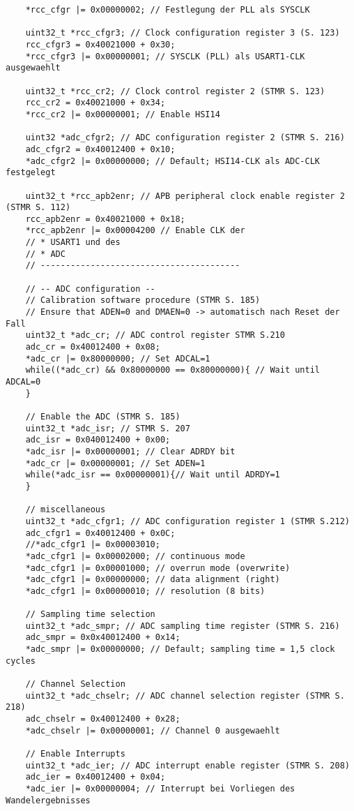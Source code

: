 \documentclass[11pt]{report}
\begin{document}
\begin{lstlisting}
	*rcc_cfgr |= 0x00000002; // Festlegung der PLL als SYSCLK

	uint32_t *rcc_cfgr3; // Clock configuration register 3 (S. 123)
	rcc_cfgr3 = 0x40021000 + 0x30;
	*rcc_cfgr3 |= 0x00000001; // SYSCLK (PLL) als USART1-CLK ausgewaehlt

	uint32_t *rcc_cr2; // Clock control register 2 (STMR S. 123)
	rcc_cr2 = 0x40021000 + 0x34;
	*rcc_cr2 |= 0x00000001; // Enable HSI14
	
	uint32 *adc_cfgr2; // ADC configuration register 2 (STMR S. 216)
	adc_cfgr2 = 0x40012400 + 0x10;
	*adc_cfgr2 |= 0x00000000; // Default; HSI14-CLK als ADC-CLK festgelegt
	
	uint32_t *rcc_apb2enr; // APB peripheral clock enable register 2 (STMR S. 112)
	rcc_apb2enr = 0x40021000 + 0x18;
	*rcc_apb2enr |= 0x00004200 // Enable CLK der 
	// * USART1 und des
	// * ADC
	// ----------------------------------------

	// -- ADC configuration --
	// Calibration software procedure (STMR S. 185)
	// Ensure that ADEN=0 and DMAEN=0 -> automatisch nach Reset der Fall
	uint32_t *adc_cr; // ADC control register STMR S.210
	adc_cr = 0x40012400 + 0x08;
	*adc_cr |= 0x80000000; // Set ADCAL=1
	while((*adc_cr) && 0x80000000 == 0x80000000){ // Wait until ADCAL=0
	}

	// Enable the ADC (STMR S. 185)
	uint32_t *adc_isr; // STMR S. 207
	adc_isr = 0x040012400 + 0x00;
	*adc_isr |= 0x00000001; // Clear ADRDY bit
	*adc_cr |= 0x00000001; // Set ADEN=1
	while(*adc_isr == 0x00000001){// Wait until ADRDY=1
	}

	// miscellaneous
	uint32_t *adc_cfgr1; // ADC configuration register 1 (STMR S.212)
	adc_cfgr1 = 0x40012400 + 0x0C;
	//*adc_cfgr1 |= 0x00003010;
	*adc_cfgr1 |= 0x00002000; // continuous mode
	*adc_cfgr1 |= 0x00001000; // overrun mode (overwrite)
	*adc_cfgr1 |= 0x00000000; // data alignment (right)
	*adc_cfgr1 |= 0x00000010; // resolution (8 bits)

	// Sampling time selection
	uint32_t *adc_smpr; // ADC sampling time register (STMR S. 216)
	adc_smpr = 0x0x40012400 + 0x14;
	*adc_smpr |= 0x00000000; // Default; sampling time = 1,5 clock cycles

	// Channel Selection
	uint32_t *adc_chselr; // ADC channel selection register (STMR S. 218)
	adc_chselr = 0x40012400 + 0x28;
	*adc_chselr |= 0x00000001; // Channel 0 ausgewaehlt

	// Enable Interrupts
	uint32_t *adc_ier; // ADC interrupt enable register (STMR S. 208)
	adc_ier = 0x40012400 + 0x04;
	*adc_ier |= 0x00000004; // Interrupt bei Vorliegen des Wandelergebnisses


\end{lstlisting}
\end{document}
